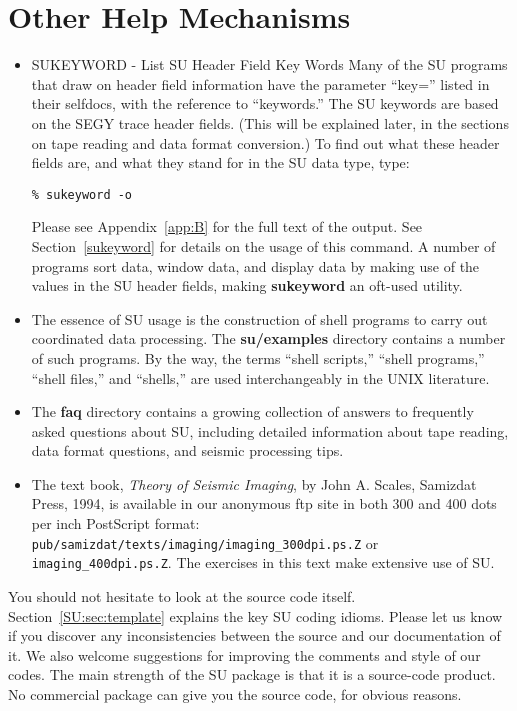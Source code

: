 {{{\section{Other Help Mechanisms}

\begin{itemize}
\item SUKEYWORD - List SU Header Field Key Words
Many of the SU programs that draw on header field information
have the parameter ``key='' listed in their selfdocs, with
the reference to ``keywords.''
The SU keywords are based on the SEGY trace header fields.
(This will be explained later, in the sections on tape reading
and data format conversion.)
To find out what these header fields are, and what they stand
for in the SU data type, type:
{ \small\begin{verbatim} 
% sukeyword -o
\end{verbatim} } \noindent
Please see Appendix~\ref{app:B} for the full text of the output. 
See Section~\ref{sukeyword} for details on the usage of this
command.  A number of programs sort data, window data, and display data
by making use of the values in the SU header fields, making
{\bf sukeyword\/} an oft-used utility.

\item The essence of {\small\sf SU} usage is the construction of shell programs
  to carry out coordinated data processing.  The {\bf su/examples\/}
  directory contains a number of such programs.  By the way, the terms
  ``shell scripts,'' ``shell programs,'' ``shell files,'' and
  ``shells,'' are used interchangeably in the UNIX literature.

\item The {\bf faq\/} directory contains a growing collection of answers
  to frequently asked questions about {\small\sf SU}, including detailed information
  about tape reading, data format questions, and seismic processing tips.

\item The text book, {\em Theory of Seismic Imaging}, by John A.
  Scales, Samizdat Press, 1994, is available in our anonymous ftp site
  in both 300 and 400 dots per inch PostScript format:
  \verb:pub/samizdat/texts/imaging/imaging_300dpi.ps.Z: or
  \verb:imaging_400dpi.ps.Z:.  The exercises in this text make
  extensive use of {\small\sf SU}.
\end{itemize}

You should not hesitate to look at the source code itself.
Section~\ref{SU:sec:template} explains the key {\small\sf SU} coding idioms.
Please let us know if you discover any inconsistencies between the
source and our documentation of it.  We also welcome suggestions for
improving the comments and style of our codes.  The main
strength of the SU package is that it is a source-code product.
No commercial package can give you the source code, for obvious
reasons.

}}}
